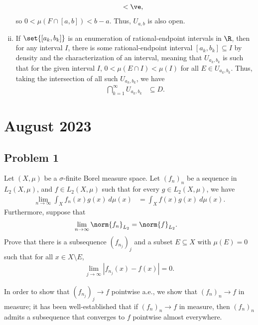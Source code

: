 \documentclass[10pt]{mypackage}
\begin{document}
\begin{enumerate}[(i)]
\begin{align*}
                                                                                           &< \ve,
    \end{align*}
    so $0 < \mu\left( F\cap [a,b] \right) < b-a$. Thus, $U_{a,b}$ is also open.
  \item If $\set{\left[ a_k,b_k \right]}$ is an enumeration of rational-endpoint intervals in $\R$, then for any interval $I$, there is some rational-endpoint interval $\left[a_k,b_k\right]\subseteq I$ by density and the characterization of an interval, meaning that $U_{a_k,b_k}$ is such that for the given interval $I$, $0 < \mu\left( E\cap I \right) < \mu\left( I \right)$ for all $E\in U_{a_k,b_k}$. Thus, taking the intersection of all such $U_{a_k,b_k}$, we have
    \begin{align*}
      \bigcap_{k=1}^{\infty}U_{a_k,b_k} &\subseteq D.
    \end{align*}
\end{enumerate}
\section{August 2023}%
\subsection{Problem 1}%
\begin{problem}
Let $\left( X,\mu \right)$ be a $\sigma$-finite Borel measure space. Let $\left( f_n \right)_n$ be a sequence in $L_2\left( X,\mu \right)$, and $f\in L_2\left( X,\mu \right)$ such that for every $g\in L_2\left( X,\mu \right)$, we have
\begin{align*}
  \lim_{n\rightarrow\infty} \int_{X}^{} f_n(x)g(x)\:d\mu(x) &= \int_{X}^{} f(x)g(x)\:d\mu(x).
\end{align*}
Furthermore, suppose that
\begin{align*}
  \lim_{n\rightarrow\infty}\norm{f_n}_{L_2} &= \norm{f}_{L_2}.
\end{align*}
Prove that there is a subsequence $\left( f_{n_j} \right)_j$ and a subset $E\subseteq X$ with $\mu\left( E \right) = 0$ such that for all $x\in X\setminus E$,
\begin{align*}
  \lim_{j\rightarrow\infty} \left\vert f_{n_j}(x)-f(x) \right\vert = 0.
\end{align*}
\end{problem}
In order to show that $\left( f_{n_j} \right)_j\rightarrow f$ pointwise a.e., we show that $\left( f_{n} \right)_n\rightarrow f$ in measure; it has been well-established that if $\left( f_n \right)_n\rightarrow f$ in measure, then $\left( f_n \right)_n$ admits a subsequence that converges to $f$ pointwise almost everywhere.\newline
\end{document}
